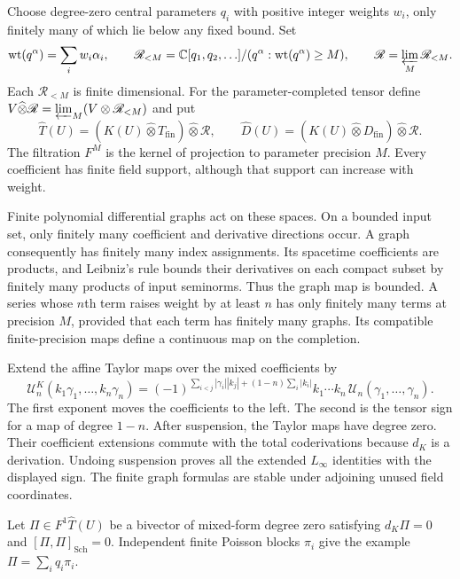 Choose degree-zero central parameters $q_i$ with
positive integer weights $w_i$, only finitely many
of which lie below any fixed bound.
Set
\[
 \operatorname{wt}(q^\alpha)=\sum_iw_i\alpha_i,
 \qquad
 \mathscr R_{<M}
   =\mathbb C[q_1,q_2,\ldots]/
       (q^\alpha:\operatorname{wt}(q^\alpha)\geq M),
 \qquad
 \mathscr R=\varprojlim_M\mathscr R_{<M}.
\]
Each $\mathscr R_{<M}$ is finite dimensional.
For the parameter-completed tensor define
$V\widehat\otimes\mathscr R
 =\varprojlim_M(V\otimes\mathscr R_{<M})$ and put
\[
 \widehat T(U)=
   (K(U)\widehat\otimes T_{\mathrm{fin}})
                 \widehat\otimes\mathscr R,\qquad
 \widehat D(U)=
   (K(U)\widehat\otimes D_{\mathrm{fin}})
                 \widehat\otimes\mathscr R.
\]
The filtration $F^M$ is the kernel of projection
to parameter precision $M$.
Every coefficient has finite field support,
although that support can increase with weight.

Finite polynomial differential graphs act on these
spaces. On a bounded input set, only finitely many
coefficient and derivative directions occur.
A graph consequently has finitely many index
assignments. Its spacetime coefficients are products,
and Leibniz's rule bounds their derivatives on each
compact subset by finitely many products of input
seminorms. Thus the graph map is bounded.
A series whose $n$th term raises weight by at least
$n$ has only finitely many terms at precision $M$,
provided that each term has finitely many graphs.
Its compatible finite-precision maps define a
continuous map on the completion.

Extend the affine Taylor maps over the mixed
coefficients by
\begin{equation}\label{eq:vol2-mixed-formality-sign}
 \mathcal U_n^K(k_1\gamma_1,\ldots,k_n\gamma_n)
 =
 (-1)^{\sum_{i<j}|\gamma_i||k_j|
              +(1-n)\sum_i|k_i|}
 k_1\cdots k_n\,\mathcal U_n(\gamma_1,\ldots,\gamma_n).
\end{equation}
The first exponent moves the coefficients to the
left. The second is the tensor sign for a map of
degree $1-n$.
After suspension, the Taylor maps have degree zero.
Their coefficient extensions commute with the
total coderivations because $d_K$ is a derivation.
Undoing suspension proves all the extended
$L_\infty$ identities with the displayed sign.
The finite graph formulas are stable under
adjoining unused field coordinates.

Let $\Pi\in F^1\widehat T(U)$ be a bivector of
mixed-form degree zero satisfying
$d_K\Pi=0$ and $[\Pi,\Pi]_{\mathrm{Sch}}=0$.
Independent finite Poisson blocks $\pi_i$ give the
example $\Pi=\sum_iq_i\pi_i$.

